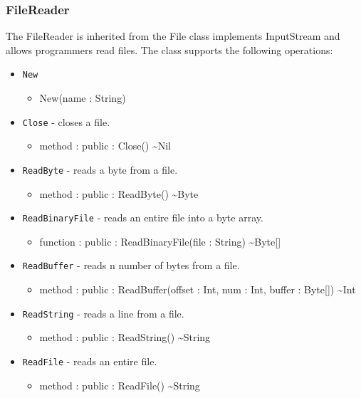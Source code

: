 \documentclass[11pt]{article}
\begin{document}
\subsubsection{FileReader}
The FileReader is inherited from the File class implements InputStream
and allows programmers read files.  The class supports the following
operations:
\begin{itemize}
\item \texttt{New}
  \begin{itemize}
  \item New(name : String)
  \end{itemize}
\item \texttt{Close} - closes a file.
  \begin{itemize}
  \item method : public : Close() \textasciitilde Nil
  \end{itemize}
\item \texttt{ReadByte} - reads a byte from a file.
  \begin{itemize}
  \item method : public : ReadByte() \textasciitilde Byte
  \end{itemize}
\item \texttt{ReadBinaryFile} - reads an entire file into a byte
  array.
  \begin{itemize}
  \item function : public : ReadBinaryFile(file : String)
    \textasciitilde Byte[]
  \end{itemize}
\item \texttt{ReadBuffer} - reads n number of bytes from a file.
  \begin{itemize}
  \item method : public : ReadBuffer(offset : Int, num : Int, buffer :
    Byte[]) \textasciitilde Int
  \end{itemize}
\item \texttt{ReadString} - reads a line from a file.
  \begin{itemize}
  \item method : public : ReadString() \textasciitilde String
  \end{itemize}
\item \texttt{ReadFile} - reads an entire file.
  \begin{itemize}
  \item method : public : ReadFile() \textasciitilde String
  \end{itemize}
\end{itemize}
\end{document}
